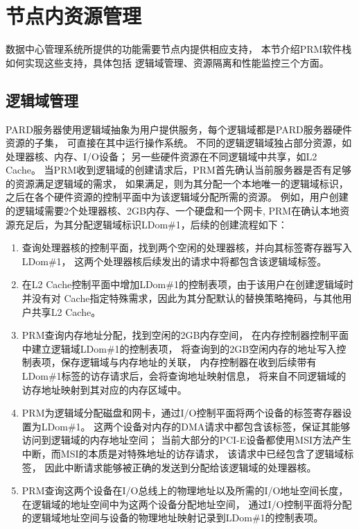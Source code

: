 \section{节点内资源管理}

数据中心管理系统所提供的功能需要节点内提供相应支持，
本节介绍PRM软件栈如何实现这些支持，具体包括
逻辑域管理、资源隔离和性能监控三个方面。

\subsection{逻辑域管理}

PARD服务器使用逻辑域抽象为用户提供服务，每个逻辑域都是PARD服务器硬件资源的子集，
可直接在其中运行操作系统。
不同的逻辑逻辑域独占部分资源，如处理器核、内存、I/O设备；
另一些硬件资源在不同逻辑域中共享，如L2 Cache。
当PRM收到逻辑域的创建请求后，PRM首先确认当前服务器是否有足够的资源满足逻辑域的需求，
如果满足，则为其分配一个本地唯一的逻辑域标识，
之后在各个硬件资源的控制平面中为该逻辑域分配所需的资源。
例如，用户创建的逻辑域需要2个处理器核、2GB内存、一个硬盘和一个网卡,
PRM在确认本地资源充足后，为其分配逻辑域标识LDom\#1，后续的创建流程如下：

\begin{enumerate}[leftmargin=2\parindent, nolistsep, label=\arabic*）]
  \item 查询处理器核的控制平面，找到两个空闲的处理器核，并向其标签寄存器写入LDom\#1，
        这两个处理器核后续发出的请求中将都包含该逻辑域标签。
  \item 在L2 Cache控制平面中增加LDom\#1的控制表项，由于该用户在创建逻辑域时并没有对
        Cache指定特殊需求，因此为其分配默认的替换策略掩码，与其他用户共享L2 Cache。
  \item PRM查询内存地址分配，找到空闲的2GB内存空间，
        在内存控制器控制平面中建立逻辑域LDom\#1的控制表项，
        将查询到的2GB空闲内存的地址写入控制表项，保存逻辑域与内存地址的关联，
        内存控制器在收到后续带有LDom\#1标签的访存请求后，会将查询地址映射信息，
        将来自不同逻辑域的访存地址映射到其对应的内存区域中。
  \item PRM为逻辑域分配磁盘和网卡，通过I/O控制平面将两个设备的标签寄存器设置为LDom\#1。
        这两个设备对内存的DMA请求中都包含该标签，保证其能够访问到逻辑域的内存地址空间；
        当前大部分的PCI-E设备都使用MSI方法产生中断，而MSI的本质是对特殊地址的访存请求，
        该请求中已经包含了逻辑域标签，
        因此中断请求能够被正确的发送到分配给该逻辑域的处理器核。
  \item PRM查询这两个设备在I/O总线上的物理地址以及所需的I/O地址空间长度，
        在逻辑域的地址空间中为这两个设备分配地址空间，
        通过I/O控制平面将分配的逻辑域地址空间与设备的物理地址映射记录到LDom\#1的控制表项。
\end{enumerate}

